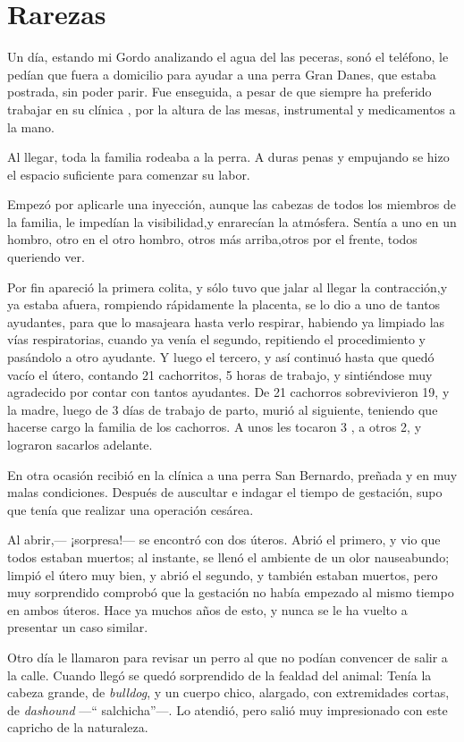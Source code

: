 \documentclass[letterpaper, 12pt]{book}
\begin{document}
\chapter{Rarezas}
Un día, estando mi Gordo analizando el agua del las peceras, sonó el teléfono, le pedían que fuera a domicilio para ayudar a una perra Gran Danes, que estaba postrada, sin poder parir. Fue enseguida, a pesar de que siempre ha preferido trabajar en su clínica , por la altura de las mesas, instrumental y medicamentos a la mano.

Al llegar, toda la familia rodeaba a la perra. A duras penas y empujando se hizo el espacio suficiente para comenzar su labor.

Empezó por aplicarle una inyección, aunque las cabezas de todos los miembros de la familia, le impedían la visibilidad,y enrarecían la atmósfera. Sentía a uno en un hombro, otro en el otro hombro, otros más arriba,otros por el frente, todos queriendo ver.

Por fin apareció la primera colita, y sólo tuvo que jalar al llegar la contracción,y ya estaba afuera, rompiendo rápidamente la placenta, se lo dio a uno de tantos ayudantes, para que lo masajeara hasta verlo respirar, habiendo ya limpiado las vías respiratorias, cuando ya venía el segundo, repitiendo el procedimiento y pasándolo a otro ayudante. Y luego el tercero, y así continuó hasta que quedó vacío el útero, contando 21 cachorritos, 5 horas de trabajo, y sintiéndose muy agradecido por contar con tantos ayudantes. De 21 cachorros sobrevivieron 19, y la madre, luego de 3 días de trabajo de parto, murió al siguiente, teniendo que hacerse cargo la familia de los cachorros. A unos les tocaron 3 , a otros 2, y lograron sacarlos adelante.

En otra ocasión recibió en la clínica a una perra San Bernardo, preñada y en muy malas condiciones. Después de auscultar e indagar el tiempo de gestación, supo que tenía que realizar una operación cesárea.

Al abrir,--- ¡sorpresa!--- se encontró con dos úteros. Abrió el primero, y vio que todos estaban muertos; al instante, se llenó el ambiente de un olor nauseabundo; limpió el útero muy bien, y abrió el segundo, y también estaban muertos, pero muy sorprendido comprobó que la gestación no había empezado al mismo tiempo en ambos úteros. Hace ya muchos años de esto, y nunca se le ha vuelto a presentar un caso similar.

Otro día le llamaron para revisar un perro al que no podían convencer de salir a la calle. Cuando llegó se quedó sorprendido de la fealdad del animal: Tenía la cabeza grande, de {\it bulldog}, y un cuerpo chico, alargado, con extremidades cortas, de {\it dashound} ---`` salchicha''---. Lo atendió, pero salió muy impresionado con este capricho de la naturaleza.
\end{document}
